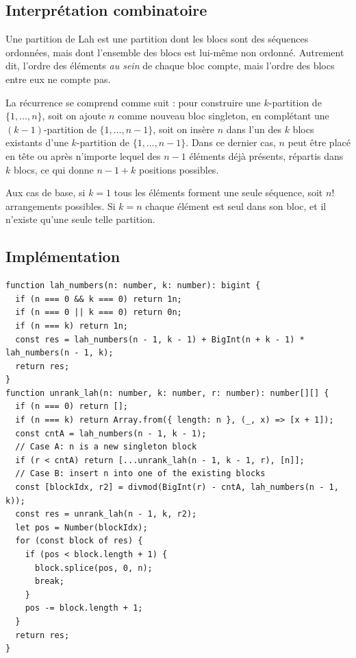 \documentclass[12pt, a4paper]{report}
\begin{document}
\subsection{Interpr\'etation combinatoire}

Une partition de Lah est une partition dont les blocs sont des s\'equences ordonn\'ees,
mais dont l'ensemble des blocs est lui-m\^eme non ordonn\'e. Autrement dit, l'ordre
des \'el\'ements \textit{au sein} de chaque bloc compte, mais l'ordre des blocs entre
eux ne compte pas.

La r\'ecurrence se comprend comme suit : pour construire une $k$-partition de
$\{1, \ldots, n\}$, soit on ajoute $n$ comme nouveau bloc singleton, en compl\'etant
une $(k-1)$-partition de $\{1, \ldots, n-1\}$, soit on ins\`ere $n$ dans l'un des
$k$ blocs existants d'une $k$-partition de $\{1, \ldots, n-1\}$. Dans ce dernier
cas, $n$ peut \^etre plac\'e en t\^ete ou apr\`es n'importe lequel des $n - 1$
\'el\'ements d\'ej\`a pr\'esents, r\'epartis dans $k$ blocs, ce qui donne $n - 1 + k$
positions possibles.

Aux cas de base, si $k = 1$ tous les \'el\'ements forment une seule s\'equence, soit
$n!$ arrangements possibles. Si $k = n$ chaque \'el\'ement est seul dans son bloc,
et il n'existe qu'une seule telle partition.

\subsection{Impl\'ementation}

\begin{verbatim}
function lah_numbers(n: number, k: number): bigint {
  if (n === 0 && k === 0) return 1n;
  if (n === 0 || k === 0) return 0n;
  if (n === k) return 1n;
  const res = lah_numbers(n - 1, k - 1) + BigInt(n + k - 1) * lah_numbers(n - 1, k);
  return res;
}
function unrank_lah(n: number, k: number, r: number): number[][] {
  if (n === 0) return [];
  if (n === k) return Array.from({ length: n }, (_, x) => [x + 1]);
  const cntA = lah_numbers(n - 1, k - 1);
  // Case A: n is a new singleton block
  if (r < cntA) return [...unrank_lah(n - 1, k - 1, r), [n]];
  // Case B: insert n into one of the existing blocks
  const [blockIdx, r2] = divmod(BigInt(r) - cntA, lah_numbers(n - 1, k));
  const res = unrank_lah(n - 1, k, r2);
  let pos = Number(blockIdx);
  for (const block of res) {
    if (pos < block.length + 1) {
      block.splice(pos, 0, n);
      break;
    }
    pos -= block.length + 1;
  }
  return res;
}
\end{verbatim}
\end{document}
